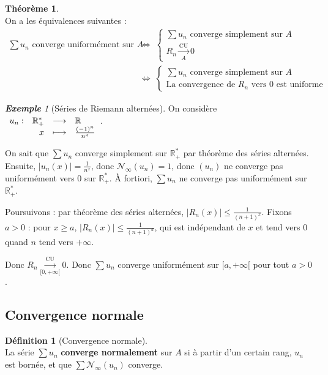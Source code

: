 \documentclass[12pt]{book}
\let\ensembleNombre\mathbb
\newcommand*\R{\ensuremath{\ensembleNombre{R}}}
\newcommand{\app}[5]{\ensuremath{
\begin{array}[t]{lrcl}
#1 : & #2 & \longrightarrow & #3 \\
    & #4 & \longmapsto & #5 \end{array}
}}
\newcommand{\lu}[1]{\ensuremath{\overset{\mathrm{CU}}{\underset{#1}{\longrightarrow}}}}
\theoremstyle{definition}
\newtheorem*{defi}{Définition}
\newtheorem{thme}{Théorème}[chapter]
\theoremstyle{remark}
\newtheorem*{ex}{\textbf{Exemple}}
\newenvironment{fdef}
  {\begin{mdframed}[roundcorner=10pt, linewidth=1pt]\begin{defi}}
  {\end{defi}\end{mdframed}}
\newenvironment{fthme}
  {\begin{mdframed}[roundcorner=10pt, linewidth=2pt]\begin{thme}}
  {\end{thme}\end{mdframed}}
\begin{document}
	\begin{fthme}\mbox{~}\\
	On a les équivalences suivantes :
	\begin{align*}
	\sum u_n \text{ converge uniformément sur } A \;&\Longleftrightarrow\; \begin{cases}
																			\sum u_n \text{ converge simplement sur } A \\
																			R_n \lu A 0
																		   \end{cases} \\
	&\Longleftrightarrow\; \begin{cases}
							\sum u_n \text{ converge simplement sur } A \\
							\text{La convergence de } R_n \text{ vers 0 est uniforme}
							\end{cases}
	\end{align*}
	\end{fthme}
	
	\begin{ex}[Séries de Riemann alternées]
	On considère $\app{u_n}{\R_+^*}{\R}{x}{\frac{(-1)^n}{n^x}}$. 
	
	On sait que $\sum u_n$ converge simplement sur $\R_+^*$ par théorème des séries alternées. Ensuite, $|u_n(x)| = \frac{1}{n^x}$, donc $\mathcal N_\infty (u_n) = 1$, donc $(u_n)$ ne converge pas uniformément vers 0 sur $\R_+^*$. À fortiori, $\sum u_n$ ne converge pas uniformément sur $\R_+^*$.
	
	Poursuivons : par théorème des séries alternées, $|R_n(x)| \leq \frac{1}{(n+1)^x}$. Fixons $a > 0$ : pour $x \geq a$, $|R_n(x)| \leq \frac{1}{(n+1)^a}$, qui est indépendant de $x$ et tend vers 0 quand $n$ tend vers $+\infty$.
	
	Donc $R_n \lu{[0, +\infty[} 0$. Donc $\sum u_n$ converge uniformément sur $[a, +\infty[$ pour tout $a > 0$.
	\end{ex}
	
	\newpage
	
	\subsection{Convergence normale}
	\begin{fdef}[Convergence normale]\mbox{~}\\
	La série $\sum u_n$ \textbf{converge normalement} sur $A$ si à partir d'un certain rang, $u_n$ est bornée, et que $\sum \mathcal N_\infty (u_n)$ converge.
	\end{fdef}
	
\end{document}
